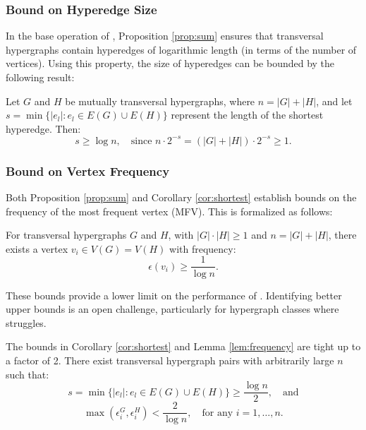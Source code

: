 \subsubsection*{Bound on Hyperedge Size}

In the base operation of \FKA, Proposition \ref{prop:sum} ensures that transversal hypergraphs contain hyperedges of logarithmic length (in terms of the number of vertices). Using this property, the size of hyperedges can be bounded by the following result:

\begin{corollary}\label{cor:shortest}
Let $G$ and $H$ be mutually transversal hypergraphs, where $n=|G|+|H|$, and let $s=\min\{|e_l|:e_l\in E(G)\cup E(H)\}$ represent the length of the shortest hyperedge. Then:
\[
s\geq\log n,\quad\text{since }n\cdot 2^{-s}=(|G|+|H|)\cdot 2^{-s}\geq 1.
\]
\end{corollary}
\noindent\textit{\cite{FK96}}

\subsubsection*{Bound on Vertex Frequency}

Both Proposition \ref{prop:sum} and Corollary \ref{cor:shortest} establish bounds on the frequency of the most frequent vertex (MFV). This is formalized as follows:

\begin{lemma}\label{lem:frequency}
For transversal hypergraphs $G$ and $H$, with $|G|\cdot|H|\geq 1$ and $n=|G|+|H|$, there exists a vertex $v_i\in V(G)=V(H)$ with frequency:
\[
\epsilon(v_i)\geq\frac{1}{\log n}.
\]
\end{lemma}
\noindent\textit{\cite{FK96}}

These bounds provide a lower limit on the performance of \FKA. Identifying better upper bounds is an open challenge, particularly for hypergraph classes where \FKA{} struggles.

\begin{observation}\label{obs:tight}
The bounds in Corollary \ref{cor:shortest} and Lemma \ref{lem:frequency} are tight up to a factor of 2. There exist transversal hypergraph pairs with arbitrarily large $n$ such that:
\[
s=\min\{|e_l|:e_l\in E(G)\cup E(H)\}\geq\frac{\log n}{2},\quad\text{and}
\]
\[
\max\left(\epsilon_i^G,\epsilon_i^H\right)<\frac{2}{\log n},\quad\text{for any }i=1,\dots,n.
\]
\end{observation}
\noindent\textit{\cite{FK96}}

